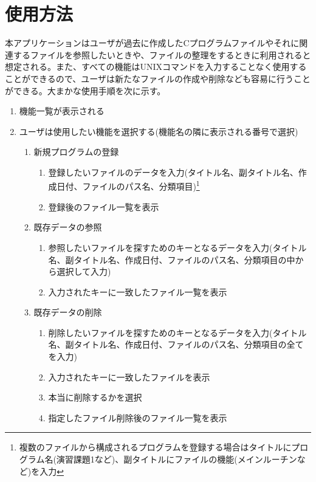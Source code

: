 \documentclass[a4j]{jarticle}
\begin{document}
\section{使用方法}
本アプリケーションはユーザが過去に作成したCプログラムファイルやそれに関連するファイルを参照したいときや、ファイルの整理をするときに利用されると想定される。また、すべての機能はUNIXコマンドを入力することなく使用することができるので、ユーザは新たなファイルの作成や削除なども容易に行うことができる。大まかな使用手順を次に示す。
\begin{enumerate}

\subsection{使用手順}

\item 機能一覧が表示される
\item ユーザは使用したい機能を選択する(機能名の隣に表示される番号で選択)
\begin{enumerate}


\item 新規プログラムの登録
\begin{enumerate}
\item 登録したいファイルのデータを入力(タイトル名、副タイトル名、作成日付、ファイルのパス名、分類項目)\footnote{複数のファイルから構成されるプログラムを登録する場合はタイトルにプログラム名(演習課題1など)、副タイトルにファイルの機能(メインルーチンなど)を入力}
\item 登録後のファイル一覧を表示
\end{enumerate}


\item 既存データの参照
\begin{enumerate}
\item 参照したいファイルを探すためのキーとなるデータを入力(タイトル名、副タイトル名、作成日付、ファイルのパス名、分類項目の中から選択して入力)
\item 入力されたキーに一致したファイル一覧を表示
\end{enumerate}

\item 既存データの削除
\begin{enumerate}
\item 削除したいファイルを探すためのキーとなるデータを入力(タイトル名、副タイトル名、作成日付、ファイルのパス名、分類項目の全てを入力)
\item 入力されたキーに一致したファイルを表示
\item 本当に削除するかを選択
\item 指定したファイル削除後のファイル一覧を表示
\end{enumerate}


\end{enumerate}
\end{enumerate}
\end{document}

